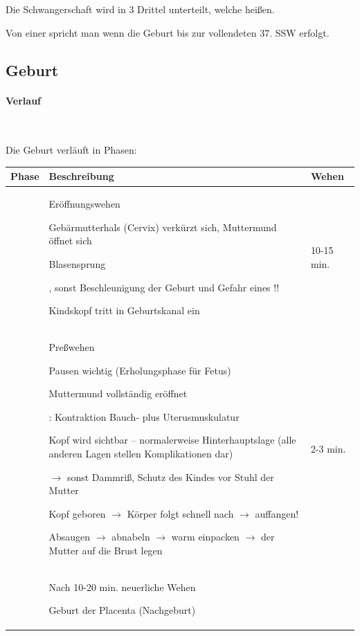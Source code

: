 Die Schwangerschaft wird in 3 Drittel unterteilt, welche
 heißen.

Von einer  spricht man wenn die Geburt bis zur vollendeten 37.
SSW erfolgt.





\subsection{Geburt}

\paragraph{Verlauf}~

Die Geburt verläuft in  Phasen:

\begin{center}
\begin{tabulary}{\linewidth}{LLL}
\toprule
Phase
 &
Beschreibung
 &
Wehen
\\\midrule
{}
 &
Eröffnungswehen

Gebärmutterhals (Cervix) verk\"urzt sich,  Muttermund
öffnet sich

Blasensprung

, sonst Beschleunigung der  Geburt
und Gefahr eines  !! 

Kindskopf tritt in Geburtskanal ein
 &
10-15 min.
\\\hline
{}
 &
Pre{\ss}wehen

Pausen wichtig (Erholungsphase f\"ur Fetus)

Muttermund vollständig eröffnet

: Kontraktion Bauch- plus 
Uterusmuskulatur

Kopf wird sichtbar -- normalerweise  Hinterhauptslage (alle
anderen Lagen stellen  Komplikationen dar)

 ${\rightarrow}$ sonst
Dammri{\ss}, Schutz des Kindes vor Stuhl der Mutter

Kopf geboren ${\rightarrow}$ Körper folgt schnell nach
${\rightarrow}$  auffangen!

Absaugen ${\rightarrow}$ abnabeln ${\rightarrow}$ warm
einpacken ${\rightarrow}$ der Mutter auf die Brust legen
&
2-3 min.
\\\hline
{}
 &
Nach 10-20 min. neuerliche Wehen

Geburt der Placenta  (Nachgeburt)
 &
\\\bottomrule
\end{tabulary}
\end{center}

